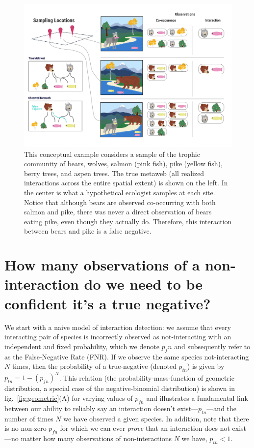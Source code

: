 \documentclass[11pt]{article}
\makeatletter
\def\maxwidth{\ifdim\Gin@nat@width>\linewidth\linewidth
\else\Gin@nat@width\fi}
\let\Oldincludegraphics\includegraphics
\renewcommand{\includegraphics}[1]{\Oldincludegraphics[width=\maxwidth]{#1}}
\makeatother
\begin{document}
\begin{figure}
\hypertarget{fig:concept}{%
\centering
\includegraphics{./figures/concept.png}
\caption{This conceptual example considers a sample of the trophic
community of bears, wolves, salmon (pink fish), pike (yellow fish),
berry trees, and aspen trees. The true metaweb (all realized
interactions across the entire spatial extent) is shown on the left. In
the center is what a hypothetical ecologist samples at each site. Notice
that although bears are observed co-occurring with both salmon and pike,
there was never a direct observation of bears eating pike, even though
they actually do. Therefore, this interaction between bears and pike is
a false negative.}\label{fig:concept}
}
\end{figure}

\hypertarget{how-many-observations-of-a-non-interaction-do-we-need-to-be-confident-its-a-true-negative}{%
\section{How many observations of a non-interaction do we need to be
confident it's a true
negative?}\label{how-many-observations-of-a-non-interaction-do-we-need-to-be-confident-its-a-true-negative}}

We start with a naive model of interaction detection: we assume that
every interacting pair of species is incorrectly observed as
not-interacting with an independent and fixed probability, which we
denote \(p_fn\) and subsequently refer to as the False-Negative Rate
(FNR). If we observe the same species not-interacting \(N\) times, then
the probability of a true-negative (denoted \(p_{tn}\)) is given by
\(p_{tn}=1-(p_{fn})^N\). This relation (the probability-mass-function of
geometric distribution, a special case of the negative-binomial
distribution) is shown in fig.~\ref{fig:geometric}(A) for varying values
of \(p_{fn}\) and illustrates a fundamental link between our ability to
reliably say an interaction doesn't exist---\(p_{tn}\)---and the number
of times \(N\) we have observed a given species. In addition, note that
there is no non-zero \(p_{fn}\) for which we can ever \emph{prove} that
an interaction does not exist---no matter how many observations of
non-interactions \(N\) we have, \(p_{tn}<1\).
\end{document}
